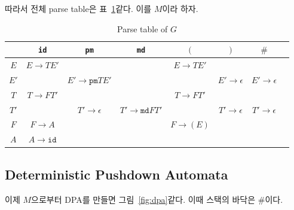\documentclass[a4paper,10pt]{scrartcl}
\numberwithin{equation}{section}
\numberwithin{figure}{section}
\numberwithin{table}{section}
\theoremstyle{definition}
\begin{document}
따라서 전체 parse table은 표~\ref{tbl:parse}\와 같다. 이를 $M$이라 하자.
\begin{table}[H]
  \centering
  \caption{Parse table of $G$}\label{tbl:parse}
  \begin{tabular}{ c c c c c c c c }
    \toprule
         & \texttt{id}         & \texttt{pm}             & \texttt{md}             & $($         & $)$               & $\#$              \\
    \midrule
    $E$  & $E \to TE'$         &                         &                         & $E \to TE'$ &                   &                   \\
    $E'$ &                     & $E' \to \texttt{pm}TE'$ &                         &             & $E' \to \epsilon$ & $E' \to \epsilon$ \\
    $T$  & $T \to FT'$         &                         &                         & $T \to FT'$ &                   &                   \\
    $T'$ &                     & $T' \to \epsilon$       & $T' \to \texttt{md}FT'$ &             & $T' \to \epsilon$ & $T' \to \epsilon$ \\
    $F$  & $F \to A$           &                         &                         & $F \to (E)$ &                   &                   \\
    $A$  & $A \to \texttt{id}$ &                         &                         &             &                   &                   \\
    \bottomrule
  \end{tabular}
\end{table}

\subsection{Deterministic Pushdown Automata}
\label{subsec:dpa}

이제 $M$으로부터 DPA를 만들면 그림~\ref{fig:dpa}\와 같다. 이때 스택의 바닥은 $\#$이다.
\end{document}
